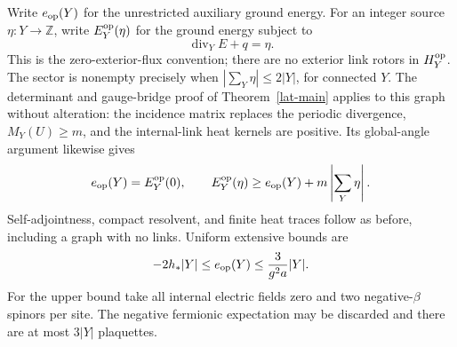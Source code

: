 Write $e_{\rm op}(Y)$ for the unrestricted auxiliary ground energy.
For an integer source $\eta:Y\to\mathbb Z$, write
$E_Y^{\rm op}(\eta)$ for the ground energy subject to
\[
 \operatorname{div}_Y E+q=\eta.
\]
This is the zero-exterior-flux convention; there are no exterior link
rotors in $H_Y^{\rm op}$.  The sector is nonempty precisely when
$|\sum_Y\eta|\le2|Y|$, for connected $Y$.
The determinant and gauge-bridge proof of Theorem~\ref{lat-main} applies
to this graph without alteration: the incidence matrix replaces the
periodic divergence, $M_Y(U)\ge m$, and the internal-link heat kernels
are positive.  Its global-angle argument likewise gives
\begin{equation}
 e_{\rm op}(Y)=E_Y^{\rm op}(0),\qquad
 E_Y^{\rm op}(\eta)\ge e_{\rm op}(Y)+m\left|\sum_Y\eta\right|.
 \label{therm4-open-comparison}
\end{equation}
Self-adjointness, compact resolvent, and finite heat traces follow as
before, including a graph with no links.  Uniform extensive bounds are
\begin{equation}
 -2h_*|Y|\le e_{\rm op}(Y)\le\frac{3}{g^2a}|Y|.
 \label{therm4-open-extensive}
\end{equation}
For the upper bound take all internal electric fields zero and two
negative-$\beta$ spinors per site.  The negative fermionic expectation
may be discarded and there are at most $3|Y|$ plaquettes.

